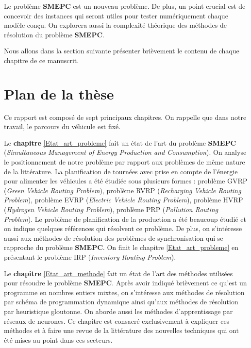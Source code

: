 Le problème \textbf{SMEPC} est un nouveau problème. De plus, un point crucial est de concevoir des instances qui seront utiles pour tester numériquement chaque modèle conçu. On explorera aussi la complexité théorique des méthodes de résolution du problème \textbf{SMEPC}.

Nous allons dans la section suivante présenter brièvement le contenu de chaque chapitre de ce manuscrit. 
\section{Plan de la thèse}
Ce rapport est composé de sept principaux chapitres. On rappelle que dans notre travail, le parcours du véhicule est fixé.

Le \textbf{chapitre} \ref{Etat_art_probleme} fait un état de l'art du problème \textbf{SMEPC} (\textit{Simultaneous Management of Energy Production and Consumption}). On analyse le positionnement de notre problème par rapport aux problèmes de même nature de la littérature. La planification de tournées avec prise en compte de l'énergie pour alimenter les véhicules a été étudiée sous plusieurs formes : problème GVRP (\textit{Green Vehicle Routing Problem}), problème RVRP (\textit{Recharging Vehicle Routing Problem}), problème EVRP (\textit{Electric Vehicle Routing Problem}), problème HVRP (\textit{Hydrogen Vehicle Routing Problem}), problème PRP (\textit{Pollution Routing Problem}). Le problème de planification de la production a été beaucoup étudié et on indique quelques références qui résolvent ce problème. De plus, on s'intéresse aussi aux méthodes de résolution des problèmes de synchronisation qui se rapproche du problème \textbf{SMEPC}. On finit le chapitre \ref{Etat_art_probleme} en présentant le problème IRP (\textit{Inventory Routing Problem}).

Le \textbf{chapitre} \ref{Etat_art_methode} fait un état de l'art des méthodes utilisées pour résoudre le problème \textbf{SMEPC}. Après avoir indiqué brièvement ce qu'est un programme en nombres entiers mixtes, on s'intéresse aux méthodes de résolution par schéma de programmation dynamique ainsi qu'aux méthodes de résolution par heuristique gloutonne. On aborde aussi les méthodes d'apprentissage par réseaux de neurones. Ce chapitre est consacré exclusivement à expliquer ces méthodes et à faire une revue de la littérature des nouvelles techniques qui ont été mises au point dans ces secteurs.

